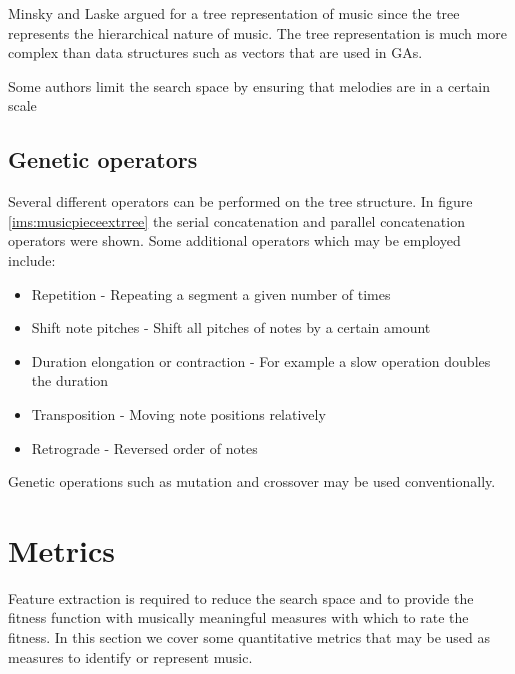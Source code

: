Minsky and Laske \cite{Minsky1992} argued for a tree representation of music since the tree represents the hierarchical nature of music. The tree representation is much more complex than data structures such as vectors that are used in \acp{GA}.

Some authors \cite{Biles1994} limit the search space by ensuring that melodies are in a certain scale 

\section{Genetic operators}
Several different operators can be performed on the tree structure. In figure \ref{ims:musicpieceextrree} the serial concatenation and parallel concatenation operators were shown.
Some additional operators which may be employed include:
\begin{itemize}
\item Repetition - Repeating a segment a given number of times
\item Shift note pitches - Shift all pitches of notes by a certain amount
\item Duration elongation or contraction - For example a slow operation doubles the duration
\item Transposition - Moving note positions relatively
\item Retrograde - Reversed order of notes
\end{itemize}

Genetic operations such as mutation and crossover may be used conventionally.

\chapter{Metrics} \label{chap:metrics}
Feature extraction is required to reduce the search space and to provide the fitness function with musically meaningful measures with which to rate the fitness. In this section we cover some quantitative metrics that may be used as measures to identify or represent music.

